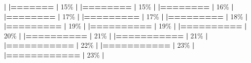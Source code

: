\documentclass[
]{book}
\newenvironment{Shaded}{\begin{snugshade}}{\end{snugshade}}
\newcommand{\DecValTok}[1]{\textcolor[rgb]{0.00,0.00,0.81}{#1}}
\newcommand{\ErrorTok}[1]{\textcolor[rgb]{0.64,0.00,0.00}{\textbf{#1}}}
\newcommand{\NormalTok}[1]{#1}
\newcommand{\SpecialCharTok}[1]{\textcolor[rgb]{0.81,0.36,0.00}{\textbf{#1}}}
\begin{document}
\begin{Shaded}
\begin{Highlighting}[]
  \SpecialCharTok{|}                                                        
  \ErrorTok{|=======}                                           \ErrorTok{|}  \DecValTok{15}\NormalTok{\%}
  \SpecialCharTok{|}                                                        
  \ErrorTok{|========}                                          \ErrorTok{|}  \DecValTok{15}\NormalTok{\%}
  \SpecialCharTok{|}                                                        
  \ErrorTok{|========}                                          \ErrorTok{|}  \DecValTok{16}\NormalTok{\%}
  \SpecialCharTok{|}                                                        
  \ErrorTok{|========}                                          \ErrorTok{|}  \DecValTok{17}\NormalTok{\%}
  \SpecialCharTok{|}                                                        
  \ErrorTok{|=========}                                         \ErrorTok{|}  \DecValTok{17}\NormalTok{\%}
  \SpecialCharTok{|}                                                        
  \ErrorTok{|=========}                                         \ErrorTok{|}  \DecValTok{18}\NormalTok{\%}
  \SpecialCharTok{|}                                                        
  \ErrorTok{|=========}                                         \ErrorTok{|}  \DecValTok{19}\NormalTok{\%}
  \SpecialCharTok{|}                                                        
  \ErrorTok{|==========}                                        \ErrorTok{|}  \DecValTok{19}\NormalTok{\%}
  \SpecialCharTok{|}                                                        
  \ErrorTok{|==========}                                        \ErrorTok{|}  \DecValTok{20}\NormalTok{\%}
  \SpecialCharTok{|}                                                        
  \ErrorTok{|==========}                                        \ErrorTok{|}  \DecValTok{21}\NormalTok{\%}
  \SpecialCharTok{|}                                                        
  \ErrorTok{|===========}                                       \ErrorTok{|}  \DecValTok{21}\NormalTok{\%}
  \SpecialCharTok{|}                                                        
  \ErrorTok{|===========}                                       \ErrorTok{|}  \DecValTok{22}\NormalTok{\%}
  \SpecialCharTok{|}                                                        
  \ErrorTok{|===========}                                       \ErrorTok{|}  \DecValTok{23}\NormalTok{\%}
  \SpecialCharTok{|}                                                        
  \ErrorTok{|============}                                      \ErrorTok{|}  \DecValTok{23}\NormalTok{\%}
  \SpecialCharTok{|}                                                        

\end{Highlighting}
\end{Shaded}
\end{document}
